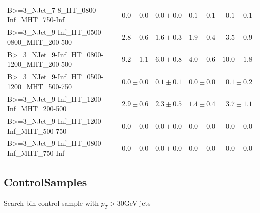 \documentclass{beamer}
\begin{document}
\begin{frame}
\begin{tabular}{lrrrr}
      B>=3\_NJet\_7-8\_HT\_0800-Inf\_MHT\_750-Inf &               $0.0\pm0.0$&               $0.0\pm0.0$&               $0.1\pm0.1$&                   $0.1\pm0.1$ \\
   B>=3\_NJet\_9-Inf\_HT\_0500-0800\_MHT\_200-500 &               $2.8\pm0.6$&               $1.6\pm0.3$&               $1.9\pm0.4$&                   $3.5\pm0.9$ \\
   B>=3\_NJet\_9-Inf\_HT\_0800-1200\_MHT\_200-500 &               $9.2\pm1.1$&               $6.0\pm0.8$&               $4.0\pm0.6$&                  $10.0\pm1.8$ \\
   B>=3\_NJet\_9-Inf\_HT\_0500-1200\_MHT\_500-750 &               $0.0\pm0.0$&               $0.1\pm0.1$&               $0.0\pm0.0$&                   $0.1\pm0.2$ \\
    B>=3\_NJet\_9-Inf\_HT\_1200-Inf\_MHT\_200-500 &               $2.9\pm0.6$&               $2.3\pm0.5$&               $1.4\pm0.4$&                   $3.7\pm1.1$ \\
    B>=3\_NJet\_9-Inf\_HT\_1200-Inf\_MHT\_500-750 &               $0.0\pm0.0$&               $0.0\pm0.0$&               $0.0\pm0.0$&                   $0.0\pm0.0$ \\
    B>=3\_NJet\_9-Inf\_HT\_0800-Inf\_MHT\_750-Inf &               $0.0\pm0.0$&               $0.0\pm0.0$&               $0.0\pm0.0$&                   $0.0\pm0.0$ \\


\bottomrule
\end{tabular}
\end{frame}

\subsection{ControlSamples}

\begin{frame}
  \begin{center}
    {\Large Search bin control sample \HT \NJets with $p_{T}>30$GeV jets}
  \end{center}
\end{frame}
\end{document}
